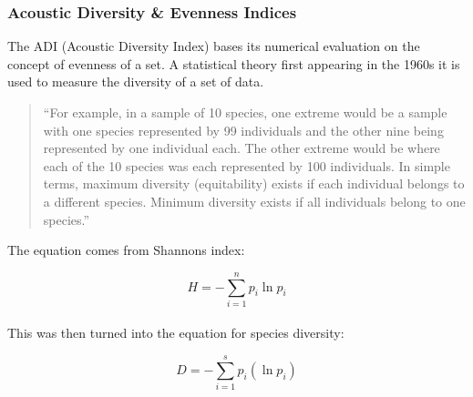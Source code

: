\subsubsection{Acoustic Diversity \& Evenness Indices}
The ADI (Acoustic Diversity Index) bases its numerical evaluation on the concept of evenness of a set. A statistical theory first appearing in the 1960\textquotesingle s it is used to measure the diversity of a set of data.\par

\begin{quote}
  ``For example, in a sample of 10 species, one extreme would be a sample with one species represented by 99 individuals and the other nine being represented by one individual each. The other extreme would be where each of the 10 species was each represented by 100 individuals. In simple terms, maximum diversity (equitability) exists if each individual belongs to a different species. Minimum diversity exists if all individuals belong to one species.''\cite{shannonWiener}
\end{quote}

The equation comes from Shannon\textquotesingle s index:\par

\begin{equation}
  H = -\sum_{i=1}^n{p_i \ln p_i}
\end{equation} \\[\eqnspace]

This was then turned into the equation for species diversity:\par

\begin{equation}
  D = -\sum_{i=1}^s{p_i (\ln p_i)}
\end{equation} \\[\eqnspace]

